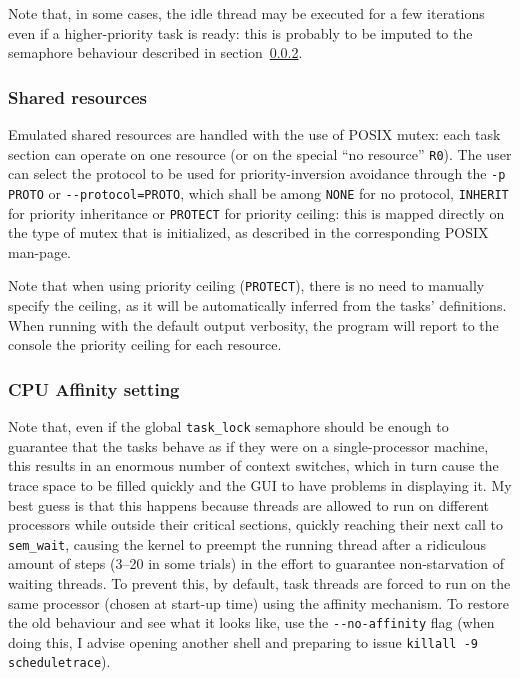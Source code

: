 \documentclass[paper=a4, fontsize=11pt]{scrartcl}
\newcommand{\mono}[1]{\texttt{#1}}
\numberwithin{equation}{section}        %
\numberwithin{figure}{section}          %
\numberwithin{table}{section}               %
\numberwithin{fragment}{section}
\begin{document}
Note that, in some cases, the idle thread may be executed for a few iterations even if a higher-priority task is ready: this is probably to be imputed to the semaphore behaviour described in section~\ref{sec:tasks:affinity}.

\subsubsection{Shared resources}\label{sec:tasks:resources}
Emulated shared resources are handled with the use of POSIX mutex: each task section can operate on one resource (or on the special ``no resource'' \mono{R0}).
The user can select the protocol to be used for priority-inversion avoidance through the \mono{-p PROTO} or \mono{-{}-protocol=PROTO}, which shall be among \mono{NONE} for no protocol, \mono{INHERIT} for priority inheritance or \mono{PROTECT} for priority ceiling: this is mapped directly on the type of mutex that is initialized, as described in the corresponding POSIX man-page\cite{man-mutexproto}.

Note that when using priority ceiling (\mono{PROTECT}), there is no need to manually specify the ceiling, as it will be automatically inferred from the tasks' definitions. When running with the default output verbosity, the program will report to the console the priority ceiling for each resource.


\subsubsection{CPU Affinity setting}\label{sec:tasks:affinity}
Note that, even if the global \mono{task\_lock} semaphore should be enough to guarantee that the tasks behave as if they were on a single-processor machine, this results in an enormous number of context switches, which in turn cause the trace space to be filled quickly and the GUI to have problems in displaying it.
My best guess is that this happens because threads are allowed to run on different processors while outside their critical sections, quickly reaching their next call to \mono{sem\_wait}, causing the kernel to preempt the running thread after a ridiculous amount of steps (3--20 in some trials) in the effort to guarantee non-starvation of waiting threads. To prevent this, by default, task threads are forced to run on the same processor (chosen at start-up time) using the affinity mechanism\cite{man-pthread-affinity}\cite{man-affinity}.
To restore the old behaviour and see what it looks like, use the \mono{-{}-no-affinity} flag (when doing this, I advise opening another shell and preparing to issue \mono{killall -9 scheduletrace}).
\end{document}

